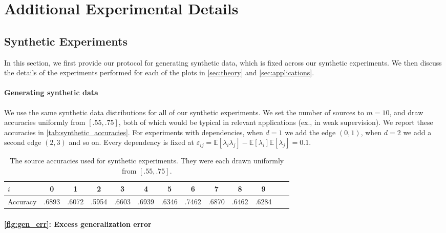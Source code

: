 \section{Additional Experimental Details}

\subsection{Synthetic Experiments}

In this section, we first provide our protocol for generating synthetic data, which is fixed across our synthetic experiments. We then discuss the details of the experiments performed for each of the plots in \autoref{sec:theory} and \autoref{sec:applications}.

\paragraph{Generating synthetic data}

We use the same synthetic data distributions for all of our synthetic experiments. We set the number of sources to $m=10$, and draw accuracies uniformly from $[.55,.75]$, both of which would be typical in relevant applications (ex., in weak supervision). We report these accuracies in \autoref{tab:synthetic_accuracies}. For experiments with dependencies, when $d=1$ we add the edge $(0,1)$, when $d=2$ we add a second edge $(2,3)$ and so on. Every dependency is fixed at $\varepsilon_{ij}=\mathbb{E}[\lambda_i\lambda_j]-\mathbb{E}[\lambda_i]\mathbb{E}[\lambda_j]=0.1$.

\begin{table}[t]
\vskip 0.15in
\renewcommand{\arraystretch}{1.25} %
\begin{center}
\begin{small}
\begin{tabular}{l|cccccccccccr}
\hline
$i$ & 0 & 1 & 2 & 3 & 4 & 5 & 6 & 7 & 8 & 9\\
\hline
Accuracy & .6893 & .6072 & .5954 & .6603 & .6939 & .6346 & .7462 & .6870 & .6462 & .6284 \\
\hline
\end{tabular}
\end{small}
\end{center}
\vskip -0.1in
\caption{The source accuracies used for synthetic experiments. They were each drawn uniformly from $[.55,.75]$.}
\label{tab:synthetic_accuracies}
\end{table}

\paragraph{\autoref{fig:gen_err}: Excess generalization error} 

